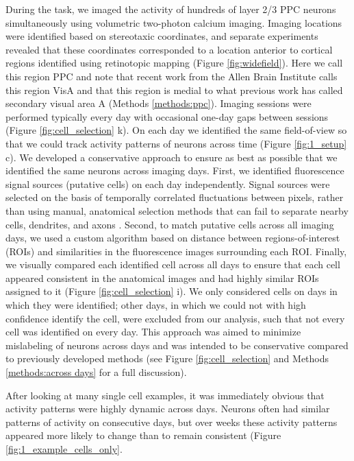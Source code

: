 During the task, we imaged the activity of hundreds of layer 2/3 PPC neurons simultaneously using volumetric two-photon calcium imaging. Imaging locations were identified based on stereotaxic coordinates, and separate experiments revealed that these coordinates corresponded to a location anterior to cortical regions identified using retinotopic mapping (Figure \ref{fig:widefield}). Here we call this region PPC and note that recent work from the Allen Brain Institute calls this region VisA  \citep{CCF2015} and that this region is medial to what previous work has called secondary visual area A \citep{Wang2007} (Methods \ref{methods:ppc}). Imaging sessions were performed typically every day with occasional one-day gaps between sessions (Figure \ref{fig:cell_selection} k). On each day we identified the same field-of-view so that we could track activity patterns of neurons across time (Figure \ref{fig:1_setup} c). We developed a conservative approach to ensure as best as possible that we identified the same neurons across imaging days. First, we identified fluorescence signal sources (putative cells) on each day independently. Signal sources were selected on the basis of temporally correlated fluctuations between pixels, rather than using manual, anatomical selection methods that can fail to separate nearby cells, dendrites, and axons \citep{Hamel2015, Peron2015}. Second, to match putative cells across all imaging days, we used a custom algorithm based on distance between regions-of-interest (ROIs) and similarities in the fluorescence images surrounding each ROI. Finally, we visually compared each identified cell across all days to ensure that each cell appeared consistent in the anatomical images and had highly similar ROIs assigned to it (Figure \ref{fig:cell_selection} i). We only considered cells on days in which they were identified; other days, in which we could not with high confidence identify the cell, were excluded from our analysis, such that not every cell was identified on every day. This approach was aimed to minimize mislabeling of neurons across days and was intended to be conservative compared to previously developed methods \citep{Huber2012, Liberti2016, Peron2015, Peters2014, Poort2015, Ziv2013} (see Figure \ref{fig:cell_selection} and Methods \ref{methods:across days} for a full discussion). 

\bigskip

After looking at many single cell examples, it was immediately obvious that activity patterns were highly dynamic across days. Neurons often had similar patterns of activity on consecutive days, but over weeks these activity patterns appeared more likely to change than to remain consistent (Figure \ref{fig:1_example_cells_only}.

